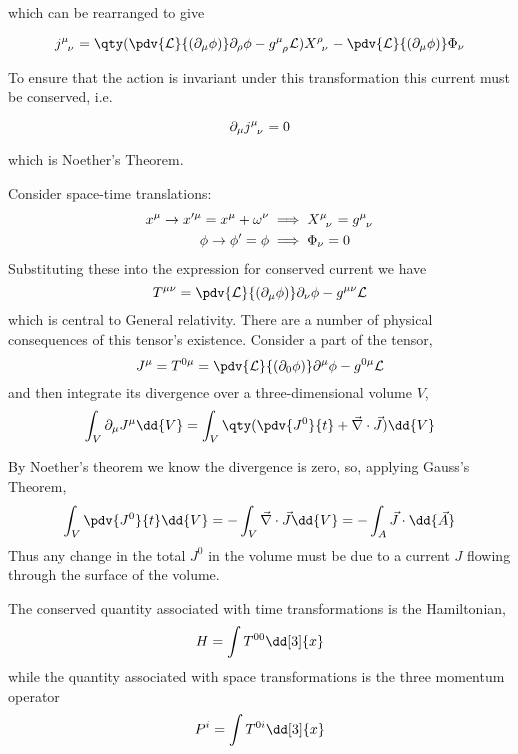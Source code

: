 which can be rearranged to give
\begin{fequation}
  \begin{equation}
\label{eq:6}
 \tensor{j}{^{\mu}_{\nu}} = \qty( \pdv{\Lag}{(\partial_{\mu} \phi) } \partial_{\rho} \phi - \tensor{g}{^{\mu}_{\rho}} \Lag ) \tensor{X}{^{\rho}_{\nu}} - \pdv{\Lag}{(\partial_{\mu} \phi)} \Phi_{\nu} 
\end{equation}
\end{fequation}
To ensure that the action is invariant under this transformation this current must be conserved, i.e. 
\begin{fequation}
  \begin{equation}
    \label{eq:7}
    \partial_{\mu} \tensor{j}{^{\mu}_{\nu}} = 0
  \end{equation}
\end{fequation}
which is Noether's Theorem.

\begin{example}
  Consider space-time translations:
  \begin{align}
    x^{\mu} \to x^{\prime \mu} = x^{\mu} + \omega^{\nu} & \implies \tensor{X}{^{\mu}_{\nu}} = \tensor{g}{^{\mu}_{\nu}} \\
\phi \to \phi^{\prime} = \phi & \implies \Phi_{\nu} = 0
  \end{align}
  Substituting these into the expression for conserved current we have
    \begin{equation}
      \label{eq:8}
      \tensor{T}{^{\mu}^{\nu}} = \pdv{\Lag}{(\partial_{\mu} \phi)} \partial_{\nu} \phi - \tensor{g}{^{\mu}^{\nu}} \Lag
    \end{equation}
    which is central to General relativity. There are a number of
    physical consequences of this tensor's existence. Consider a part
    of the tensor,
    \[ \tensor{J}{^{\mu}} = \tensor{T}{^{0}^{\mu}} =
    \pdv{\Lag}{(\partial_0 \phi)} \partial^{\mu}\phi -
    \tensor{g}{^0^{\mu}} \Lag \] and then integrate its divergence
    over a three-dimensional volume $V$,
    \[ \int_V \partial_{\mu} J^{\mu} \dd{V} = \int_V \qty(
    \pdv{J^0}{t} + \vec{\nabla} \cdot \vec{J} ) \dd{V} \]

    By Noether's theorem we know the divergence is zero, so, applying
    Gauss's Theorem,
    \[ \int_V \pdv{J^0}{t} \dd{V} = - \int_V \vec{\nabla} \cdot
    \vec{J} \dd{V} = - \int_A \vec{J} \cdot \dd{\vec{A}} \] Thus any
    change in the total $J^0$ in the volume must be due to a current
    $J$ flowing through the surface of the volume.

The conserved quantity associated with time transformations is the Hamiltonian,
\begin{equation}
  \label{eq:9}
  H = \int \tensor{T}{^0^0} \dd[3]{x}
\end{equation}
while the quantity associated with space transformations is the three momentum operator
\begin{equation}
  \label{eq:10}
  P^i = \int \tensor{T}{^0^i} \dd[3]{x}
\end{equation}
\end{example}


